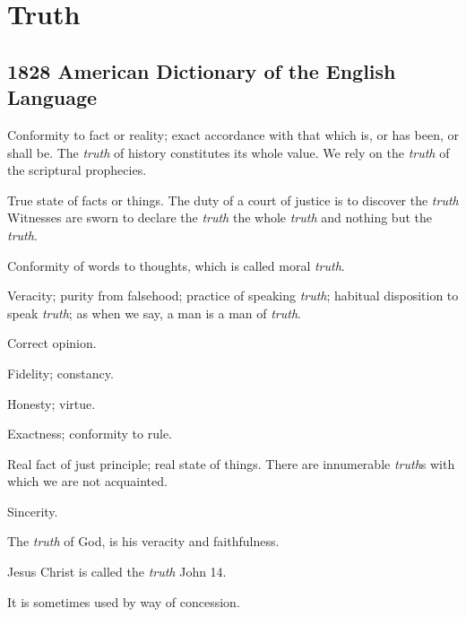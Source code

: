 \section{Truth}
	\label{TRUTH}
	

\subsection{1828 American Dictionary of the English Language} %
	\label{TRUTH-1828}

	\begin{compactitem}
		\item[1] Conformity to fact or reality; exact accordance with that which is, or has been, or shall be. The \textit{truth} of history constitutes its whole value. We rely on the \textit{truth} of the scriptural prophecies.
		\item[2] True state of facts or things. The duty of a court of justice is to discover the \textit{truth} Witnesses are sworn to declare the \textit{truth} the whole \textit{truth} and nothing but the \textit{truth}.
		\item[3] Conformity of words to thoughts, which is called moral \textit{truth}.
		\item[4] Veracity; purity from falsehood; practice of speaking \textit{truth}; habitual disposition to speak \textit{truth}; as when we say, a man is a man of \textit{truth}.
		\item[5] Correct opinion.
		\item[6] Fidelity; constancy.
		\item[7] Honesty; virtue.
		\item[8] Exactness; conformity to rule.
		\item[9] Real fact of just principle; real state of things. There are innumerable \textit{truth}s with which we are not acquainted.
		\item[10] Sincerity.
		\item[11] The \textit{truth} of God, is his veracity and faithfulness.
		\item[12] Jesus Christ is called the \textit{truth} John 14.
		\item[13] It is sometimes used by way of concession.
	\end{compactitem}


